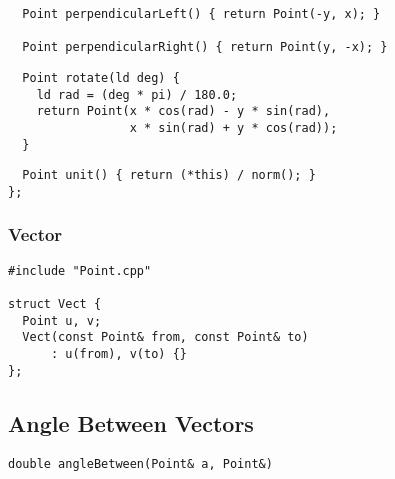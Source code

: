 \documentclass[twoside]{article}
\begin{document}
\begin{multicols*}{2}
\begin{verbatim}
  Point perpendicularLeft() { return Point(-y, x); }

  Point perpendicularRight() { return Point(y, -x); }
\end{verbatim}
\vspace{-12pt}
\begin{verbatim}
  Point rotate(ld deg) {
    ld rad = (deg * pi) / 180.0;
    return Point(x * cos(rad) - y * sin(rad),
                 x * sin(rad) + y * cos(rad));
  }
\end{verbatim}
\vspace{-12pt}
\begin{verbatim}
  Point unit() { return (*this) / norm(); }
};
\end{verbatim}

\subsubsectionfont{\large\bfseries\sffamily\underline}
\subsubsection*{Vector}
\begin{verbatim}
#include "Point.cpp"

struct Vect {
  Point u, v;
  Vect(const Point& from, const Point& to)
      : u(from), v(to) {}
};
\end{verbatim}

\subsectionfont{\large\bfseries\sffamily\underline}
\subsection*{Angle Between Vectors}
\begin{verbatim}
double angleBetween(Point& a, Point&)
\end{verbatim}

\subsectionfont{\large\bfseries\sffamily\underline}

\end{multicols*}
\end{document}
